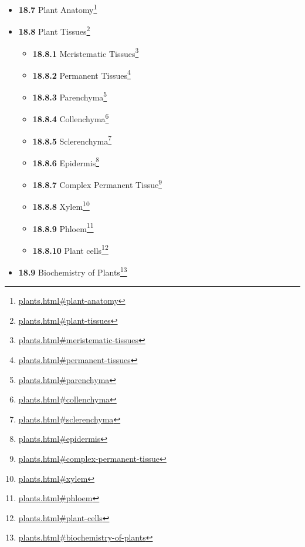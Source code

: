 \documentclass[
]{article}
\providecommand{\tightlist}{%
  \setlength{\itemsep}{0pt}\setlength{\parskip}{0pt}}
\providecommand{\tightlist}{%
  \setlength{\itemsep}{0pt}\setlength{\parskip}{0pt}}
\let\rmarkdownfootnote\footnote%
\def\footnote{\protect\rmarkdownfootnote}
\renewcommand{\href}[2]{#2\footnote{\url{#1}}}
\theoremstyle{definition}
\theoremstyle{definition}
\theoremstyle{definition}
\theoremstyle{remark}
\begin{document}
\begin{itemize}
\begin{itemize}
    \begin{itemize}
    \tightlist
    \item
      \href{plants.html\#fertilization-and-embryogenesis}{\emph{}\textbf{18.6.1}
      Fertilization and Embryogenesis}
    \end{itemize}
  \item
    \href{plants.html\#plant-anatomy}{\emph{}\textbf{18.7} Plant
    Anatomy}
  \item
    \href{plants.html\#plant-tissues}{\emph{}\textbf{18.8} Plant
    Tissues}

    \begin{itemize}
    \tightlist
    \item
      \href{plants.html\#meristematic-tissues}{\emph{}\textbf{18.8.1}
      Meristematic Tissues}
    \item
      \href{plants.html\#permanent-tissues}{\emph{}\textbf{18.8.2}
      Permanent Tissues}
    \item
      \href{plants.html\#parenchyma}{\emph{}\textbf{18.8.3} Parenchyma}
    \item
      \href{plants.html\#collenchyma}{\emph{}\textbf{18.8.4}
      Collenchyma}
    \item
      \href{plants.html\#sclerenchyma}{\emph{}\textbf{18.8.5}
      Sclerenchyma}
    \item
      \href{plants.html\#epidermis}{\emph{}\textbf{18.8.6} Epidermis}
    \item
      \href{plants.html\#complex-permanent-tissue}{\emph{}\textbf{18.8.7}
      Complex Permanent Tissue}
    \item
      \href{plants.html\#xylem}{\emph{}\textbf{18.8.8} Xylem}
    \item
      \href{plants.html\#phloem}{\emph{}\textbf{18.8.9} Phloem}
    \item
      \href{plants.html\#plant-cells}{\emph{}\textbf{18.8.10} Plant
      cells}
    \end{itemize}
  \item
    \href{plants.html\#biochemistry-of-plants}{\emph{}\textbf{18.9}
    Biochemistry of Plants}


\end{itemize}
\end{itemize}
\end{document}
